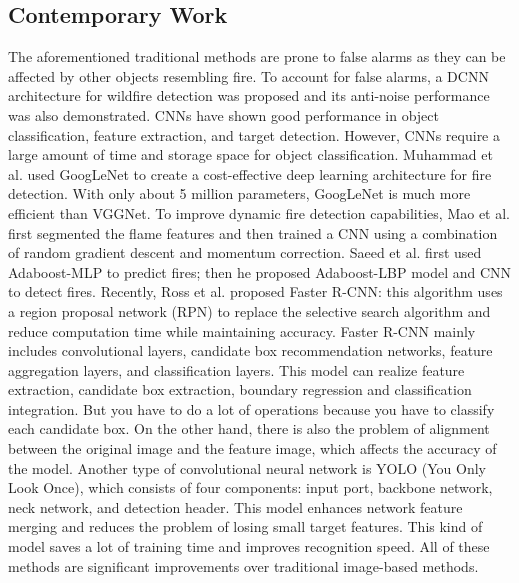 \subsection{Contemporary Work}
The aforementioned traditional methods are prone to false alarms as they can be affected by other objects resembling fire. To account for false alarms, a DCNN architecture \cite{saliency_zhao} for wildfire detection was proposed and its anti-noise performance was also demonstrated. CNNs have shown good performance in object classification, feature extraction, and target detection. However, CNNs require a large amount of time and storage space for object classification. Muhammad et al. \cite{early_fire_muhammad} used GoogLeNet to create a cost-effective deep learning architecture for fire detection. With only about 5 million parameters, GoogLeNet is much more efficient than VGGNet. To improve dynamic fire detection capabilities, Mao et al. \cite{multichannel_mao} first segmented the flame features and then trained a CNN using a combination of random gradient descent and momentum correction. Saeed et al. \cite{early_fire_saeed} first used Adaboost-MLP to predict fires; then he proposed Adaboost-LBP model and CNN to detect fires. Recently, Ross et al. \cite{hierarchies_girshick} proposed Faster R-CNN: this algorithm uses a region proposal network (RPN) to replace the selective search algorithm and reduce computation time while maintaining accuracy. Faster R-CNN mainly includes convolutional layers, candidate box recommendation networks, feature aggregation layers, and classification layers. This model can realize feature extraction, candidate box extraction, boundary regression and classification integration. But you have to do a lot of operations because you have to classify each candidate box. On the other hand, there is also the problem of alignment between the original image and the feature image, which affects the accuracy of the model. Another type of convolutional neural network is YOLO \cite{yolo_bochkovskiy} (You Only Look Once), which consists of four components: input port, backbone network, neck network, and detection header. This model enhances network feature merging and reduces the problem of losing small target features. This kind of model saves a lot of training time and improves recognition speed. All of these methods are significant improvements over traditional image-based methods.